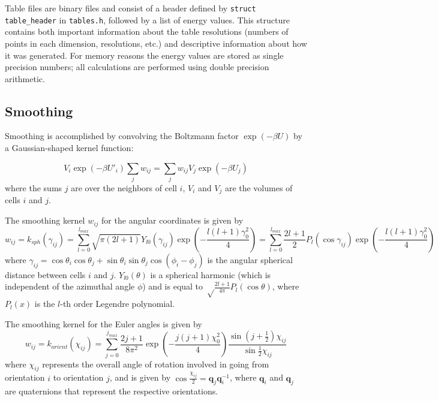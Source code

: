 \documentclass{article}      %
\begin{document}
Table files are binary files and consist of a header defined by \verb+struct table_header+ in \verb+tables.h+, followed by a list of energy values.   This structure contains both important information about the table resolutions (numbers of points in each dimension, resolutions, etc.) and descriptive information about how it was generated.   For memory reasons the energy values are stored as single precision numbers; all calculations are performed using double precision arithmetic.

\subsection{Smoothing}
Smoothing is accomplished by convolving the Boltzmann factor $\exp{(-\beta U)}$ by a Gaussian-shaped kernel function:
  
\begin{equation}
V_i \exp(-\beta U'_i) \sum_{j} w_{ij} = \sum_{j} w_{ij} V_j \exp(-\beta U_j)
\end{equation}
where the sums $j$ are over the neighbors of cell $i$, $V_i$ and $V_j$ are the volumes of cells $i$ and $j$. 

The smoothing kernel $w_{ij}$ for the angular coordinates is given by
\begin{equation}
w_{ij} = k_{sph}(\gamma_{ij}) =  \sum_{l=0}^{l_{max}} \sqrt{\pi(2l+1)}Y_{l0}(\gamma_{ij}) \exp\left(-\frac{l(l+1)\gamma_0^2}{4}\right) = \sum_{l=0}^{l_{max}} \frac{2l+1}{2} P_l(\cos \gamma_{ij})\exp \left(-\frac{l(l+1)\gamma_0^2}{4}\right)
\end{equation}
where $\gamma_{ij} = \cos \theta_i \cos \theta_j + \sin \theta_i \sin \theta_j \cos(\phi_i-\phi_j)$ is the angular spherical distance between cells $i$ and $j$. $Y_{l0}(\theta)$ is a spherical harmonic (which is independent of the azimuthal angle $\phi$) and is equal to $\sqrt\frac{2l+1}{4\pi} P_l(\cos \theta)$, where $P_l(x)$ is the $l$-th order Legendre polynomial.

The smoothing kernel for the Euler angles is given by 
\begin{equation}
w_{ij} = k_{orient}(\chi_{ij}) = \sum_{j=0}^{j_{max}} \frac{2j+1}{8\pi^2} \exp\left(-\frac{j(j+1)\chi_0^2}{4}\right)\frac{\sin \left(j+\frac{1}{2}\right)\chi_{ij}}{\sin \frac{1}{2}\chi_{ij}}
\end{equation}
where $\chi_{ij}$ represents the overall angle of rotation involved in going from orientation $i$ to orientation $j$, and is given by $\cos \frac{\chi_{ij}}{2} = \mathbf{q}_j \mathbf{q}_i^{-1}$, where $\mathbf{q}_i$ and $\mathbf{q}_j$ are quaternions that represent the respective orientations. 
\end{document}
